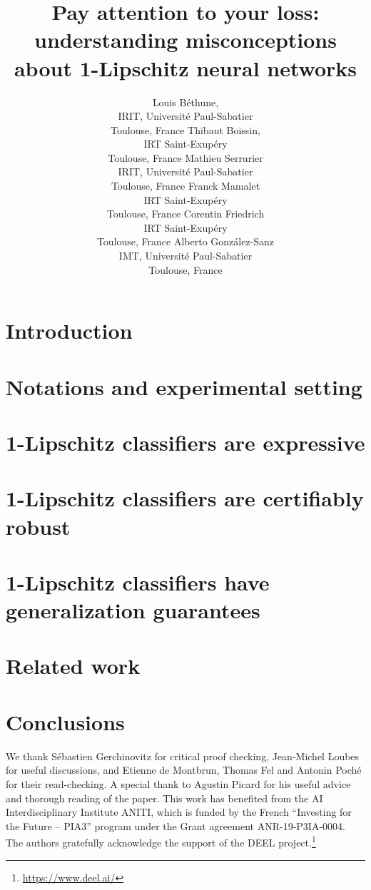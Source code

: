 \documentclass{article}
\title{Pay attention to your loss: understanding misconceptions about 1-Lipschitz neural networks}
\author{Louis Béthune, \footnotemark[2]\\
IRIT, Université Paul-Sabatier\\
Toulouse, France
\And Thibaut Boissin, \footnotemark[2]\\
IRT Saint-Exupéry\\
Toulouse, France
\And Mathieu Serrurier\\
IRIT, Université Paul-Sabatier\\
Toulouse, France
\And Franck Mamalet\\
IRT Saint-Exupéry\\
Toulouse, France
\And Corentin Friedrich\\
IRT Saint-Exupéry\\
Toulouse, France
\And Alberto Gonz\'alez-Sanz\\
IMT, Université Paul-Sabatier\\
Toulouse, France
}
\theoremstyle{break}
\begin{document}
\maketitle

\begin{abstract}

    
    
\end{abstract}

\section{Introduction}\label{sec:intro}
    
\vspace{-2mm}
\section{Notations and experimental setting}\label{sec:notations}
\vspace{-2mm}
    
\section{1-Lipschitz classifiers are expressive}\label{sec:classificationpower}
    
\section{1-Lipschitz classifiers are certifiably robust}\label{sec:robustness}
    
\vspace{-2mm}
\section{1-Lipschitz classifiers have generalization guarantees}\label{sec:generalize}
    
\vspace{-2mm}
\section{Related work}
    
\vspace{-2mm}
\section{Conclusions}
     
\vspace{-2mm}
\begin{ack}
We thank S\'ebastien Gerchinovitz for critical proof checking, Jean-Michel Loubes for useful discussions, and Etienne de Montbrun, Thomas Fel and Antonin Poch\'e for their read-checking. A special thank to Agustin Picard for his useful advice and thorough reading of the paper. This work has benefited from the AI Interdisciplinary Institute ANITI, which is funded by the French ``Investing for the Future – PIA3'' program under the Grant agreement ANR-19-P3IA-0004. The authors gratefully acknowledge the support of the DEEL project.\footnote{\url{https://www.deel.ai/}}  
\end{ack}
\end{document}
